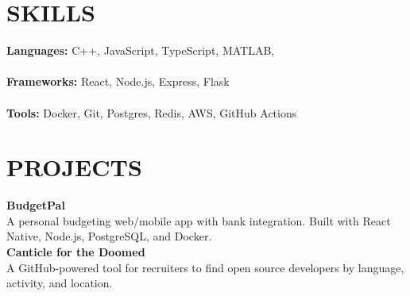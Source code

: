 \documentclass[11pt]{article}
\begin{document}
\hfill
\begin{minipage}[t]{0.32\textwidth}
    \section*{SKILLS}

    \textbf{Languages:} C++, JavaScript, TypeScript, MATLAB,  \\\\
    \textbf{Frameworks:} React, Node.js, Express, Flask \\\\
    \textbf{Tools:} Docker, Git, Postgres, Redis, AWS, GitHub Actions\\

    \section*{PROJECTS}

    \textbf{BudgetPal} \\
    A personal budgeting web/mobile app with bank integration. Built with React Native, Node.js, PostgreSQL, and Docker.\\

    \textbf{Canticle for the Doomed} \\
    A GitHub-powered tool for recruiters to find open source developers by language, activity, and location.
\end{minipage}
\end{document}
